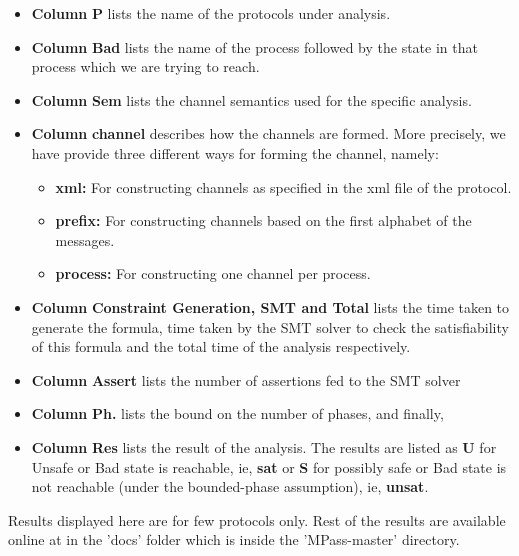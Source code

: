 \begin{itemize}
\item {\bf Column} {\bf P} lists the name of the protocols under analysis.
\item {\bf Column} {\bf Bad} lists the name of the process followed by the state in that process which we are trying to reach.
\item {\bf Column} {\bf Sem} lists the channel semantics used for the specific analysis.
\item {\bf Column} {\bf channel} describes how the    channels are formed.  More precisely, we have provide three different ways for forming the channel, namely:

\begin{itemize}
\item {\bf xml:}  For constructing  channels as specified in the xml  file of the protocol.
\item {\bf prefix:} For constructing channels based on the first alphabet of the messages.
\item {\bf process:} For constructing  one channel per process.
\end{itemize}

\item {\bf Column} {\bf Constraint Generation, SMT  and Total} lists the time taken to generate  the formula, time taken by the SMT solver to check the satisfiability of this formula and the total time of the analysis respectively.
\item {\bf Column} {\bf Assert} lists the number of assertions fed to the SMT solver
\item {\bf Column} {\bf Ph.} lists the bound on the number of phases, and finally,
\item {\bf Column} {\bf Res} lists the result of the analysis. The results are listed as {\bf U} for Unsafe or Bad state is reachable, ie, {\bf sat} or {\bf S} for possibly safe or Bad state is not reachable (under the bounded-phase assumption), ie, {\bf unsat}.


\end{itemize}
Results displayed here are for few protocols only. Rest of the results are available online at \cite{github.MPass} 
in the 'docs' folder which is inside the 'MPass-master' directory.



